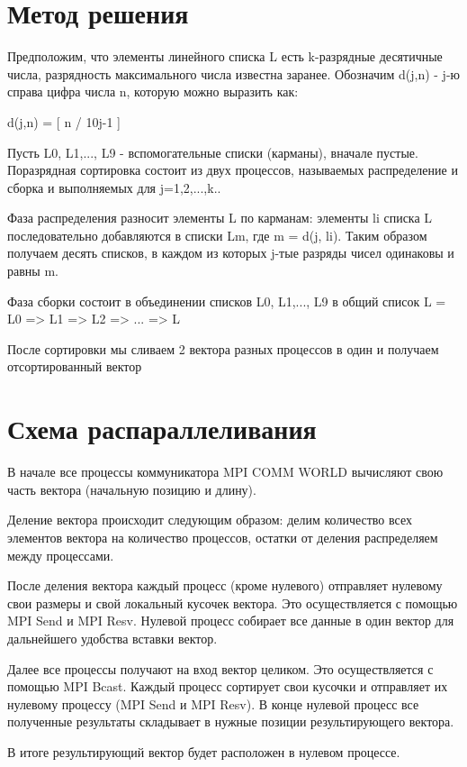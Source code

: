 \documentclass{report}
\begin{document}
\section*{Метод решения}
Предположим, что элементы линейного списка L есть k-разрядные десятичные числа, разрядность максимального числа известна заранее. Обозначим d(j,n) - j-ю справа цифра числа n, которую можно выразить как:
\par
d(j,n) = [ n / 10j-1 ] %
\par
Пусть L0, L1,..., L9 - вспомогательные списки (карманы), вначале пустые. Поразрядная сортировка состоит из двух процессов, называемых распределение и сборка и выполняемых для j=1,2,...,k..
\par 
Фаза распределения разносит элементы L по карманам: элементы li списка L последовательно добавляются в списки Lm, где m = d(j, li). Таким образом получаем десять списков, в каждом из которых j-тые разряды чисел одинаковы и равны m.
\par 
Фаза сборки состоит в объединении списков L0, L1,..., L9 в общий список L = L0 => L1 => L2 => ... => L
\par 
После сортировки мы сливаем  2 вектора разных процессов в один и получаем отсортированный вектор 
\newpage

\section*{Схема распараллеливания}
В начале все процессы коммуникатора MPI COMM WORLD вычисляют свою часть вектора (начальную позицию и длину).  
\par
Деление вектора происходит следующим образом: делим количество всех элементов вектора на количество процессов, остатки от деления распределяем между процессами.
\par
После деления вектора каждый процесс (кроме нулевого) отправляет нулевому свои размеры и свой локальный кусочек вектора. Это осуществляется с помощью MPI Send и MPI Resv. Нулевой процесс собирает все данные в один вектор для дальнейшего удобства вставки вектор.
\par
Далее все процессы получают на вход вектор целиком. Это осуществляется с помощью MPI Bcast. Каждый процесс сортирует свои кусочки и отправляет их нулевому процессу (MPI Send и MPI Resv). В конце нулевой процесс все полученные результаты складывает в нужные позиции результирующего вектора.
\par
В итоге результирующий вектор будет расположен в нулевом процессе.
\newpage
\end{document}
